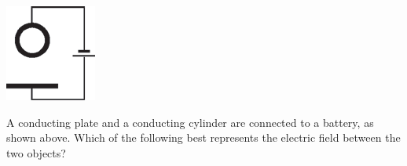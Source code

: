 \begin{center}
\includegraphics[scale=0.5]{images/img-004-008.png}
\end{center}

\begin{questions}\setcounter{question}{11}\question
A conducting plate and a conducting cylinder are connected to a battery, as shown above. Which of the following best represents the electric field between the two objects?

\begin{oneparchoices}
\choice {}
\choice {}
\choice {}
\choice {}
\choice {}
\end{oneparchoices}\end{questions}

